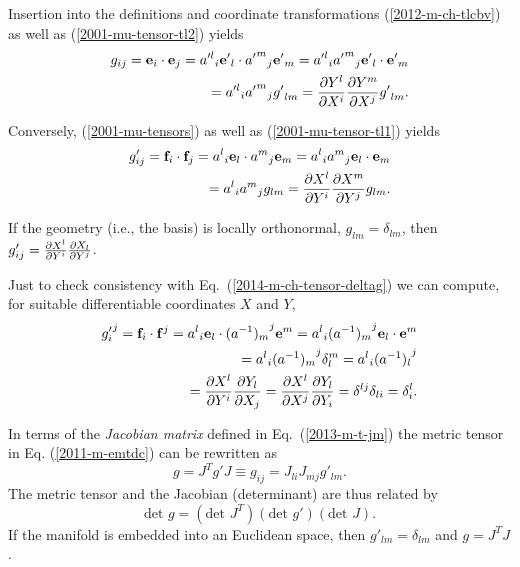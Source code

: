 Insertion into the definitions and coordinate transformations
(\ref{2012-m-ch-tlcbv}) as well as      (\ref{2001-mu-tensor-tl2})
yields
\begin{equation}
\begin{split}
g_{ij}={\bf e}_i\cdot {\bf e}_j
={a'^l}_i{\bf e'}_l\cdot {{a'}^m}_j{\bf e'}_m
={a'^l}_i{{a'}^m}_j {\bf e'}_l\cdot {\bf e'}_m \\
= {a'^l}_i{{a'}^m}_j  {g'}_{lm}
= {\partial { Y }^l\over \partial X^i}{\partial { Y }^m\over \partial X^j} {g'}_{lm}
.
\label{2011-m-emtdc}
\end{split}
\end{equation}

Conversely,  (\ref{2001-mu-tensors}) as well as    (\ref{2001-mu-tensor-tl1})
yields
\begin{equation}
\begin{split}
g'_{ij}={\bf f}_i\cdot {\bf f}_j
={a^l}_i{\bf e}_l\cdot {a^m}_j{\bf e}_m
={a^l}_i {a^m}_j {\bf e}_l\cdot {\bf e}_m  \\
= {a^l}_i {a^m}_j  {g}_{lm}
= {\partial {X}^l\over \partial { Y }^i}{\partial {X}^m\over \partial { Y }^j} {g}_{lm}
.
\end{split}
\end{equation}


If the geometry (i.e., the basis) is locally orthonormal, ${g}_{lm}=\delta_{lm}$,
then
$g'_{ij}={\partial {X}^l\over \partial { Y }^i}{\partial {X}_l\over \partial { Y }^j}$.

Just to check consistency with Eq.~(\ref{2014-m-ch-tensor-deltag}) we can compute,
for suitable differentiable coordinates $X$ and $ Y $,
\begin{equation}
\begin{split}
{g'_i}^j={\bf f}_i\cdot {{\bf f}}^j
={a^l}_i{\bf e}_l\cdot {(a^{-1})_m}^j{\bf e}^m
={a^l}_i {(a^{-1})_m}^j {\bf e}_l\cdot {\bf e}^m  \\
= {a^l}_i {(a^{-1})_m}^j \delta_l^m
= {a^l}_i {(a^{-1})_l}^j  \\
= {\partial {X}^l\over \partial { Y }^i}{\partial { Y }_l\over \partial {X}_j}
= {\partial {X}^l\over \partial {X}^j}{\partial { Y }_l\over \partial { Y }_i}
= \delta^{lj}\delta_{li}
= \delta^l_i
.
\end{split}
\end{equation}

In terms of the
{\em  Jacobian matrix} defined in Eq.~(\ref{2013-m-t-jm})
the metric tensor in Eq. (\ref{2011-m-emtdc})
can be rewritten as
\begin{equation}
g = J^T g' J
\equiv g_{ij}= J_{li}J_{mj}g'_{lm}
.
\label{2011-m-emtdcJ}
\end{equation}
The metric tensor and the Jacobian (determinant)
are thus related by
\begin{equation}
\textrm{det }g = (\textrm{det }J^T) (\textrm{det } g')(\textrm{det } J)
.
\label{2011-m-emtdcJd}
\end{equation}
If the manifold is embedded into an Euclidean space,
then $g'_{lm}=\delta_{lm}$
and  $g = J^T  J $.

